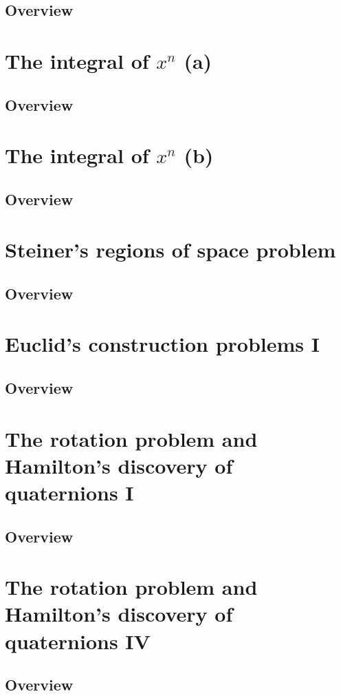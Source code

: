 \documentclass{article}
\begin{document}
\subsection{Overview}%
\label{sub:Overview}
\section{The integral of $x^n$ (a)}
\subsection{Overview}%
\label{sub:Overview}
\section{The integral of $x^n$ (b)}
\subsection{Overview}%
\label{sub:Overview}
\section{Steiner's regions of space problem}
\subsection{Overview}%
\label{sub:Overview}
\section{Euclid's construction problems I}
\subsection{Overview}%
\label{sub:Overview}
\section{The rotation problem and Hamilton's discovery of quaternions I}
\subsection{Overview}%
\label{sub:Overview}
\section{The rotation problem and Hamilton's discovery of quaternions IV}
\subsection{Overview}%
\label{sub:Overview}
\end{document}

